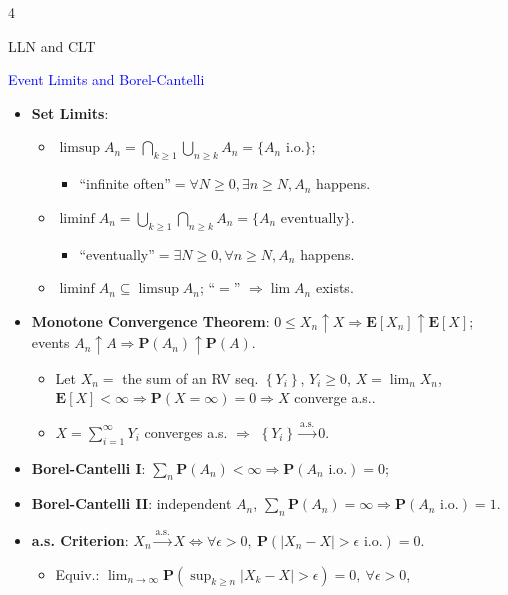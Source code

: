 \documentclass[landscape,a4paper]{article}
\newcommand{\PP}{\mathbf{P}}
\newcommand{\EE}{\mathbf{E}}
\begin{document}
\begin{multicols*}{4}
\begin{card}{LLN and CLT}
\begin{itemize}
			\end{itemize}
		\end{card}
		\begin{card}{\textcolor{blue}{Event Limits and Borel-Cantelli}}
			{\color{blue}
			\begin{itemize}
				\item \textbf{Set Limits}:
				\begin{itemize}
					\item $\limsup A_n=\bigcap_{k\ge1}\bigcup_{n\ge k}A_n=\{A_n\text{ i.o.}\}$;
					\begin{itemize}
						\item ``infinite often''$=\forall N\ge 0, \exists n \ge N, A_n$ happens.
					\end{itemize}
					\item $\liminf A_n=\bigcup_{k\ge1}\bigcap_{n\ge k}A_n=\{A_n\text{ eventually}\}$.
					\begin{itemize}
						\item ``eventually''$=\exists N\ge 0, \forall n \ge N, A_n$ happens.
					\end{itemize}
					\item $\liminf A_n\subseteq\limsup A_n$; ``$=$'' $\Rightarrow\lim A_n$ exists. 
				\end{itemize}
				\item \textbf{Monotone Convergence Theorem}: $0\le X_n\uparrow X\Rightarrow\EE[X_n]\uparrow\EE[X]$; events $A_n\uparrow A\Rightarrow\PP(A_n)\uparrow\PP(A)$.
				\begin{itemize}
					\item Let $X_n=$ the sum of an RV seq. $\left\{Y_i\right\}$, $Y_i\ge 0$, $X=\lim_n X_n$,\\$\EE[X]<\infty\Rightarrow\mathbf P(X=\infty)=0\Rightarrow X$ converge a.s..
					\item $X=\sum_{i=1}^\infty Y_i$ converges a.s. $\Rightarrow$ $\left\{Y_i\right\}\xrightarrow{\mathrm{a.s.}}0$.
				\end{itemize}
				\item \textbf{Borel-Cantelli I}: $\sum_n\PP(A_n)<\infty\Rightarrow\PP(A_n\text{ i.o.})=0$;
				\item \textbf{Borel-Cantelli II}: independent $A_n$, $\sum_n\PP(A_n)=\infty\Rightarrow\PP(A_n\text{ i.o.})=1$.
				\item \textbf{a.s. Criterion}: $X_n\xrightarrow{\mathrm{a.s.}}X\Leftrightarrow\forall\epsilon>0,\ \PP(|X_n-X|>\epsilon\text{ i.o.})=0$.
				\begin{itemize}
					\item Equiv.: $\lim_{n\to\infty}\PP(\sup_{k\ge n}|X_k-X|>\epsilon)=0,\ \forall\epsilon>0$,

\end{itemize}
\end{itemize}}
\end{card}
\end{multicols*}
\end{document}
